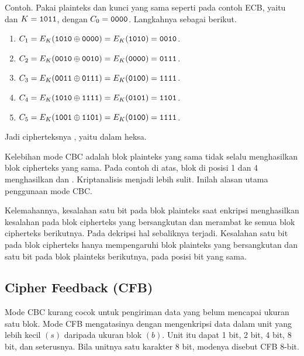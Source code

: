 Contoh. Pakai plainteks dan kunci yang sama seperti pada contoh ECB, yaitu
 dan $K = \texttt{1011}$, dengan $C_0 = \texttt{0000}$. Langkahnya
sebagai berikut.
\begin{enumerate}
    \item $C_1 = E_K(\texttt{1010} \oplus \texttt{0000}) = E_K(\texttt{1010}) =
          \texttt{0010}$.
    \item $C_2 = E_K(\texttt{0010} \oplus \texttt{0010}) = E_K(\texttt{0000}) =
          \texttt{0111}$.
    \item $C_3 = E_K(\texttt{0011} \oplus \texttt{0111}) = E_K(\texttt{0100}) =
          \texttt{1111}$.
    \item $C_4 = E_K(\texttt{1010} \oplus \texttt{1111}) = E_K(\texttt{0101}) =
          \texttt{1101}$.
    \item $C_5 = E_K(\texttt{1001} \oplus \texttt{1101}) = E_K(\texttt{0100}) =
          \texttt{1111}$.
\end{enumerate}
Jadi cipherteksnya , yaitu  dalam heksa.

Kelebihan mode CBC adalah blok plainteks yang sama tidak selalu menghasilkan
blok cipherteks yang sama. Pada contoh di atas, blok  di posisi 1 dan
4 menghasilkan  dan . Kriptanalisis menjadi lebih sulit.
Inilah alasan utama penggunaan mode CBC.

Kelemahannya, kesalahan satu bit pada blok plainteks saat enkripsi menghasilkan
kesalahan pada blok cipherteks yang bersangkutan dan merambat ke semua blok
cipherteks berikutnya. Pada dekripsi hal sebaliknya terjadi. Kesalahan satu bit
pada blok cipherteks hanya mempengaruhi blok plainteks yang bersangkutan dan
satu bit pada blok plainteks berikutnya, pada posisi bit yang sama.

\subsection{Cipher Feedback (CFB)}

Mode CBC kurang cocok untuk pengiriman data yang belum mencapai ukuran satu
blok. Mode CFB mengatasinya dengan mengenkripsi data dalam unit yang lebih kecil
$(s)$ daripada ukuran blok $(b)$. Unit itu dapat 1 bit, 2 bit, 4 bit, 8 bit, dan
seterusnya. Bila unitnya satu karakter 8 bit, modenya disebut CFB 8-bit.

